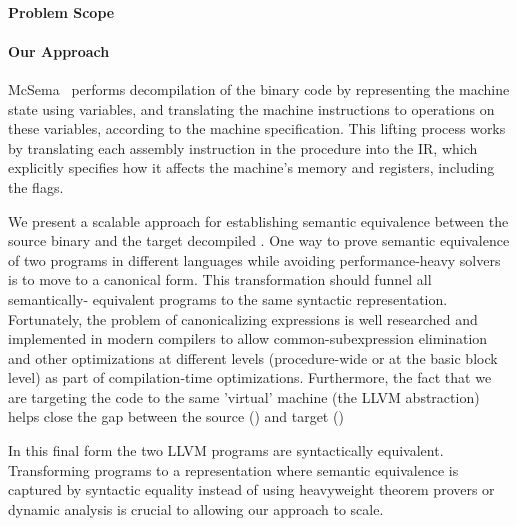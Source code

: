 \paragraph{Problem Scope}

\paragraph{Our Approach}

McSema~\cite{McSema:Recon14} performs decompilation of the binary code by representing the machine state using variables, and translating the machine instructions to operations on these variables, according to the machine specification. This lifting process works by translating each assembly instruction in the procedure into the IR, which explicitly specifies how it affects the machine's memory and registers, including the flags.

We present a scalable approach for establishing semantic equivalence between the source binary and the target decompiled \LLVM.
One way to prove semantic equivalence of two programs in different languages while avoiding performance-heavy solvers is to move to a canonical form. This transformation should funnel all semantically- equivalent programs to the same syntactic representation. Fortunately, the problem of canonicalizing expressions is well researched and implemented in modern compilers to allow common-subexpression elimination and other optimizations at different levels (procedure-wide or at the basic block level) as part of compilation-time optimizations.   
Furthermore, the fact that we are targeting the code to the same 'virtual' machine (the LLVM abstraction) helps close the gap between the source (\ISA) and target (\LLVM)

In this final form the two LLVM programs are syntactically equivalent. Transforming programs to a representation where semantic equivalence is captured by syntactic equality instead of using heavyweight theorem provers or dynamic analysis is crucial to allowing our approach to scale.






